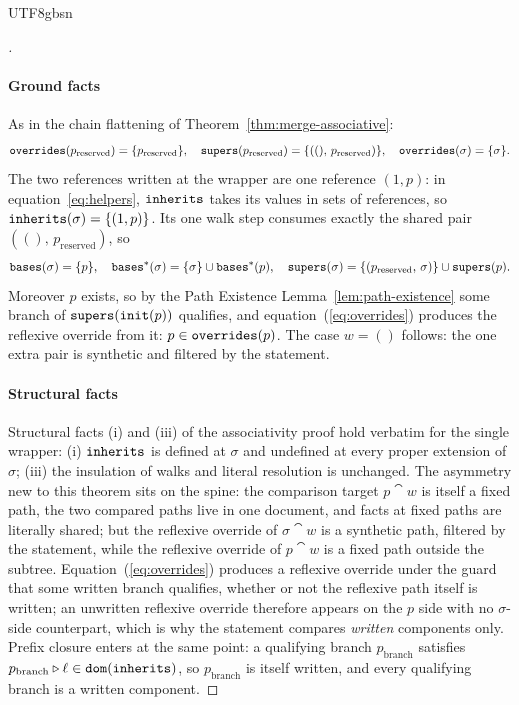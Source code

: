 \begin{CJK*}{UTF8}{gbsn}
\begin{proof}[]
  \paragraph{Ground facts}
  As in the chain flattening of
  Theorem~\ref{thm:merge-associative}:
  \[
    \mathtt{overrides}(p_{\mathrm{reserved}}) = \{p_{\mathrm{reserved}}\},
    \quad
    \mathtt{supers}(p_{\mathrm{reserved}}) = \{((),\, p_{\mathrm{reserved}})\},
    \quad
    \mathtt{overrides}(\sigma) = \{\sigma\}.
  \]
  The two references written at the wrapper are one reference
  $(1, p)$: in equation~\eqref{eq:helpers}, $\mathtt{inherits}$ takes its
  values in sets of references, so $\mathtt{inherits}(\sigma) = \{(1, p)\}$.
  Its one walk step consumes exactly the shared pair
  $((),\, p_{\mathrm{reserved}})$, so
  \[
    \mathtt{bases}(\sigma) = \{p\},
    \quad
    \mathtt{bases}^*(\sigma) = \{\sigma\} \cup \mathtt{bases}^*(p),
    \quad
    \mathtt{supers}(\sigma) = \{(p_{\mathrm{reserved}},\, \sigma)\} \cup \mathtt{supers}(p).
  \]
  Moreover
  $p$ exists, so by the Path Existence
  Lemma~\ref{lem:path-existence} some branch of
  $\mathtt{supers}(\mathtt{init}(p))$ qualifies, and
  equation~(\ref{eq:overrides}) produces the reflexive override
  from it: $p \in \mathtt{overrides}(p)$. The case $w = ()$ follows: the
  one extra pair is synthetic and filtered by the statement.

  \paragraph{Structural facts}
  Structural facts (i) and (iii) of the associativity proof hold
  verbatim for the single wrapper: (i) $\mathtt{inherits}$ is defined at
  $\sigma$ and undefined at every proper extension of $\sigma$;
  (iii) the insulation of walks and literal resolution is
  unchanged. The asymmetry new to this theorem sits on the spine:
  the comparison target $p \cat w$ is itself a fixed path, the two
  compared paths live in one document, and facts at fixed paths are
  literally shared; but the reflexive override of
  $\sigma \cat w$ is a synthetic path, filtered by the statement,
  while the reflexive override of $p \cat w$ is a fixed path
  outside the subtree. Equation~(\ref{eq:overrides}) produces a
  reflexive override under the guard that some written branch
  qualifies, whether or not the reflexive path itself is written;
  an unwritten reflexive override therefore appears on the $p$ side
  with no $\sigma$-side counterpart, which is why the statement
  compares \emph{written} components only. Prefix closure enters at
  the same point: a qualifying branch $p_{\mathrm{branch}}$
  satisfies
  $p_{\mathrm{branch}} \mathbin{\triangleright} \ell \in \mathtt{dom}(\mathtt{inherits})$, so
  $p_{\mathrm{branch}}$ is itself written, and every qualifying
  branch is a written component.


\end{proof}
\end{CJK*}
